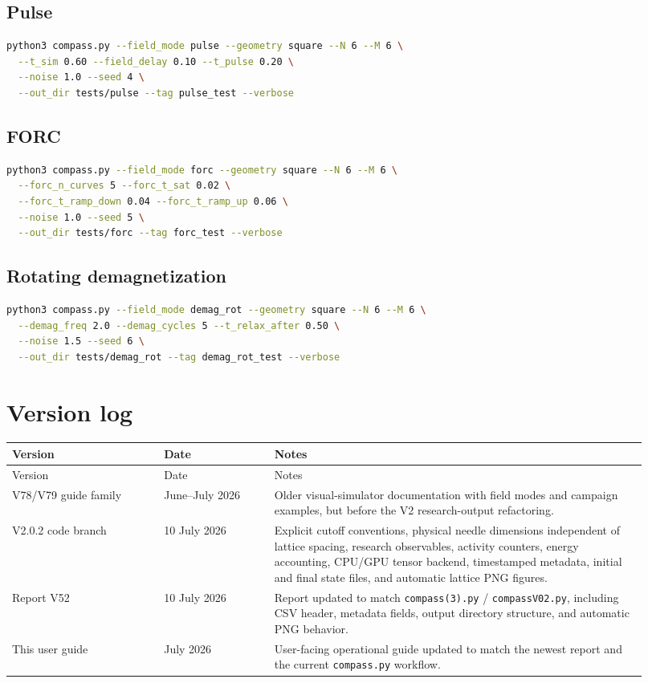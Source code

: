 \documentclass[11pt,a4paper]{article}
\newcommand{\code}[1]{\texttt{#1}}
\begin{document}
\subsection{Pulse}
\begin{lstlisting}[language=bash]
python3 compass.py --field_mode pulse --geometry square --N 6 --M 6 \
  --t_sim 0.60 --field_delay 0.10 --t_pulse 0.20 \
  --noise 1.0 --seed 4 \
  --out_dir tests/pulse --tag pulse_test --verbose
\end{lstlisting}

\subsection{FORC}
\begin{lstlisting}[language=bash]
python3 compass.py --field_mode forc --geometry square --N 6 --M 6 \
  --forc_n_curves 5 --forc_t_sat 0.02 \
  --forc_t_ramp_down 0.04 --forc_t_ramp_up 0.06 \
  --noise 1.0 --seed 5 \
  --out_dir tests/forc --tag forc_test --verbose
\end{lstlisting}

\subsection{Rotating demagnetization}
\begin{lstlisting}[language=bash]
python3 compass.py --field_mode demag_rot --geometry square --N 6 --M 6 \
  --demag_freq 2.0 --demag_cycles 5 --t_relax_after 0.50 \
  --noise 1.5 --seed 6 \
  --out_dir tests/demag_rot --tag demag_rot_test --verbose
\end{lstlisting}

\section{Version log}
\label{app:version_log}

\begin{longtable}{p{0.22\linewidth}p{0.16\linewidth}p{0.54\linewidth}}
\toprule
Version & Date & Notes \\
\midrule
\endfirsthead
\toprule
Version & Date & Notes \\
\midrule
\endhead
V78/V79 guide family & June--July 2026 & Older visual-simulator documentation with field modes and campaign examples, but before the V2 research-output refactoring. \\
V2.0.2 code branch & 10 July 2026 & Explicit cutoff conventions, physical needle dimensions independent of lattice spacing, research observables, activity counters, energy accounting, CPU/GPU tensor backend, timestamped metadata, initial and final state files, and automatic lattice PNG figures. \\
Report V52 & 10 July 2026 & Report updated to match \code{compass(3).py} / \code{compassV02.py}, including CSV header, metadata fields, output directory structure, and automatic PNG behavior. \\
This user guide & July 2026 & User-facing operational guide updated to match the newest report and the current \code{compass.py} workflow. \\
\bottomrule
\end{longtable}
\end{document}
